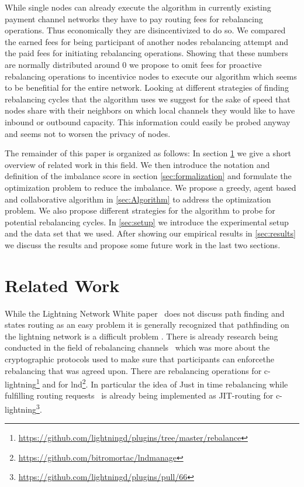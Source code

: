 \documentclass[a4paper]{paper}
\begin{document}
While single nodes can already execute the algorithm in currently existing payment channel networks they have to pay routing fees for rebalancing operations.
Thus economically they are disincentivized to do so.
We compared the earned fees for being participant of another nodes rebalancing attempt and the paid fees for initiating rebalancing operations.
Showing that these numbers are normally distributed around $0$ we propose to omit fees for proactive rebalancing operations to incentivice nodes to execute our algorithm which seems to be benefitial for the entire network. 
Looking at different strategies of finding rebalancing cycles that the algorithm uses we suggest for the sake of speed that nodes share with their neighbors on which local channels they would like to have inbound or outbound capacity.
This information could easily be probed anyway and seems not to worsen the privacy of nodes.

The remainder of this paper is organized as follows: In section \cref{sec:relatedWork} we give a short overview of related work in this field.
We then introduce the notation and definition of the imbalance score in section \cref{sec:formalization} and formulate the optimization problem to reduce the imbalance.
We propose a greedy, agent based and collaborative algorithm in \ref{sec:Algorithm} to address the optimization problem.
We also propose different strategies for the algorithm to probe for potential rebalancing cycles.
In \cref{sec:setup} we introduce the experimental setup and the data set that we used.
After showing our empirical results in \cref{sec:results} we discuss the results and propose some future work in the last two sections.



\section{Related Work}
\label{sec:relatedWork}

While the Lightning Network White paper~\cite{poon2016bitcoin} does not discuss path finding and states routing as an easy problem it is generally recognized that pathfinding on the lightning network is a difficult problem \cite{piatkivskyi2018split, prihodko2016flare, bagaria2019boomerang, pickhardt2019pathfinding, grunspan2018ant, sivaraman2018routing}.
There is already research being conducted in the field of rebalancing channels~\cite{khalil2017revive} which was more about the cryptographic protocols used to make sure that participants can enforcethe rebalancing that was agreed upon.
There are rebalancing operations for c-lightning\footnote{\url{https://github.com/lightningd/plugins/tree/master/rebalance}} and for lnd\footnote{\url{https://github.com/bitromortac/lndmanage}}.
In particular the idea of Just in time rebalancing while fulfilling routing requests~\cite{pickhardt2019jit} is already being implemented as JIT-routing for c-lightning\footnote{\url{https://github.com/lightningd/plugins/pull/66}}. 
\end{document}
